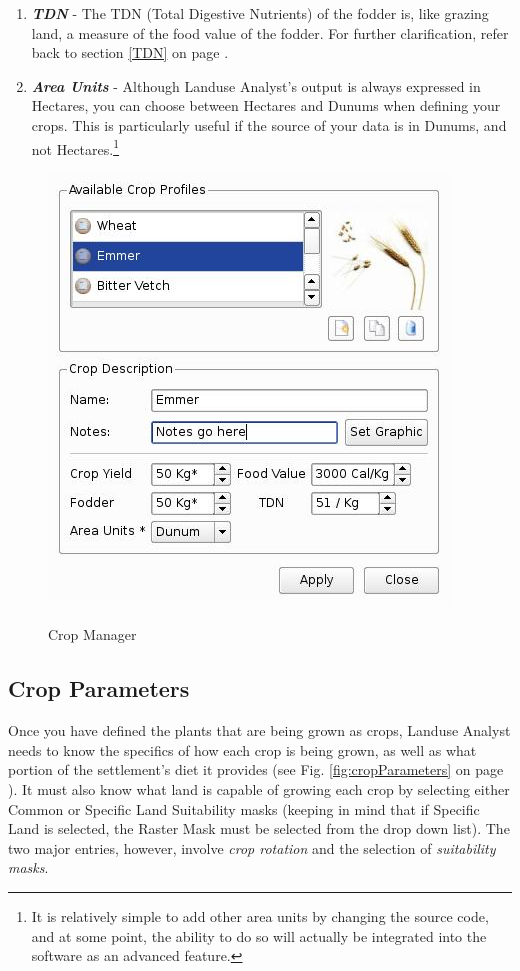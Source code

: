 \begin{enumerate}
      \item \textbf{\textit{TDN}} - The TDN (Total Digestive Nutrients) of the
fodder is, like grazing land, a measure of the food value of the fodder.  For
further clarification, refer back to section \ref{TDN} on page \pageref{TDN}.

      \item \textbf{\textit{Area Units}} - Although Landuse Analyst's output is
always expressed in Hectares, you can choose between Hectares and Dunums when
defining your crops.  This is particularly useful if the source of your data is
in Dunums, and not Hectares.\footnote{It is relatively simple to add other area
units by changing the source code, and at some point, the ability to do so will
actually be integrated into the software as an advanced feature.}
    \end{enumerate}

      \begin{figure}[htbp]
        \includegraphics[scale=.6]{./images/cropManager.jpg}
      \label{fig:cropManager} \caption{Crop Manager}
    \end{figure}


  \subsection{Crop Parameters}
  \label{cropParameters}
  Once you have defined the plants that are being grown as crops, Landuse
Analyst needs to know the specifics of how each crop is being grown, as well as
what portion of the settlement's diet it provides (see Fig.
\ref{fig:cropParameters} on page \pageref{fig:cropParameters}).  It must also
know what land is capable of growing each crop by selecting either Common or
Specific Land Suitability masks (keeping in mind that if Specific Land is
selected, the Raster Mask must be selected from the drop down list).  The two
major entries, however, involve \textit{crop rotation} and the selection of
\textit{suitability masks}.

